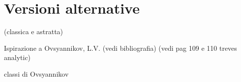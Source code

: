 \chapter{Versioni alternative}
(classica e astratta)

Ispirazione a Ovsyannikov, L.V. (vedi bibliografia) (vedi pag 109 e 110 treves analytic)

classi di Ovsyannikov